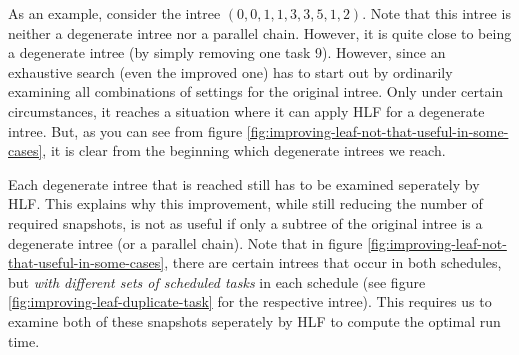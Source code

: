 As an example, consider the intree $(0,0,1,1,3,3,5,1,2)$. Note that this intree is neither a degenerate intree nor a parallel chain. However, it is quite close to being a degenerate intree (by simply removing one task 9). However, since an exhaustive search (even the improved one) has to start out by ordinarily examining all combinations of settings for the original intree. Only under certain circumstances, it reaches a situation where it can apply HLF for a degenerate intree. But, as you can see from figure \ref{fig:improving-leaf-not-that-useful-in-some-cases}, it is clear from the beginning which degenerate intrees we reach. 

Each degenerate intree that is reached still has to be examined seperately by HLF. This explains why this improvement, while still reducing the number of required snapshots, is not as useful if only a subtree of the original intree is a degenerate intree (or a parallel chain). Note that in figure \ref{fig:improving-leaf-not-that-useful-in-some-cases}, there are certain intrees  that occur in both schedules, but \emph{with different sets of scheduled tasks} in each schedule (see figure \ref{fig:improving-leaf-duplicate-task} for the respective intree). This requires us to examine both of these snapshots seperately by HLF to compute the optimal run time.

